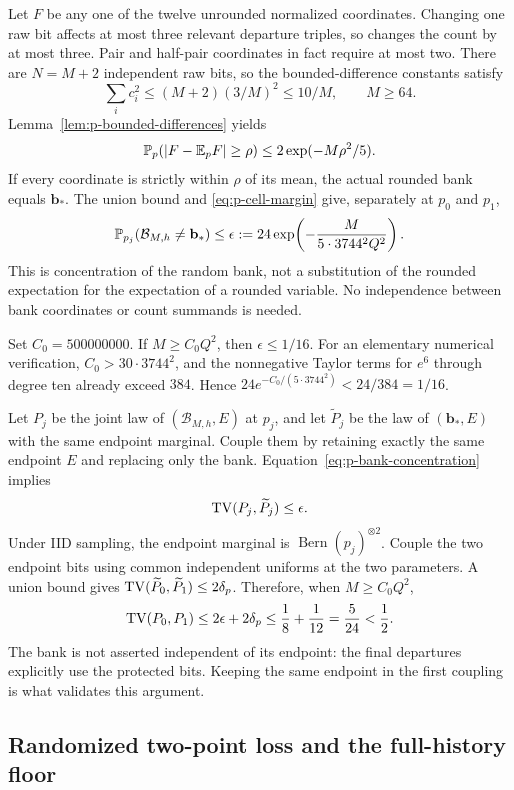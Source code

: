Let $F$ be any one of the twelve unrounded normalized coordinates.
Changing one raw bit affects at most three relevant departure triples,
so changes the count by at most three.  Pair and half-pair coordinates
in fact require at most two.  There are $N=M+2$ independent raw bits,
so the bounded-difference constants satisfy
\[
 \sum_i c_i^2\le(M+2)(3/M)^2\le10/M,\qquad M\ge64.
\]
Lemma~\ref{lem:p-bounded-differences} yields
\[
 \mathbb P_p(|F-\mathbb E_pF|\ge\rho)\le2\exp(-M\rho^2/5).
\]
If every coordinate is strictly within $\rho$ of its mean, the actual rounded
bank equals $\mathbf b_*$.  The union bound and
\eqref{eq:p-cell-margin} give, separately at $p_0$ and $p_1$,
\begin{equation}\label{eq:p-bank-concentration}
 \mathbb P_{p_j}(\mathcal B_{M,h}\ne\mathbf b_*)
 \le\epsilon:=24\exp\!\left(-\frac{M}{5\cdot3744^2Q^2}\right).
\end{equation}
This is concentration of the random bank, not a substitution of the
rounded expectation for the expectation of a rounded variable.
No independence between bank coordinates or count summands is needed.

Set $C_0=500000000$.  If $M\ge C_0Q^2$, then
$\epsilon\le1/16$.  For an elementary numerical verification,
$C_0>30\cdot3744^2$, and the nonnegative Taylor terms for $e^6$
through degree ten already exceed $384$.  Hence
$24e^{-C_0/(5\cdot3744^2)}<24/384=1/16$.

Let $P_j$ be the joint law of $(\mathcal B_{M,h},E)$ at $p_j$, and
let $\widetilde P_j$ be the law of $(\mathbf b_*,E)$ with the same
endpoint marginal.  Couple them by retaining exactly the same endpoint
$E$ and replacing only the bank.  Equation~\eqref{eq:p-bank-concentration}
implies
\[
 \operatorname{TV}(P_j,\widetilde P_j)\le\epsilon.
\]
Under IID sampling, the endpoint marginal is
$\operatorname{Bern}(p_j)^{\otimes2}$.  Couple the two endpoint bits
using common independent uniforms at the two parameters.  A union
bound gives $\operatorname{TV}(\widetilde P_0,\widetilde P_1)\le2\delta_p$.
Therefore, when $M\ge C_0Q^2$,
\begin{equation}\label{eq:p-bank-TV}
 \operatorname{TV}(P_0,P_1)\le2\epsilon+2\delta_p
 \le\frac18+\frac1{12}=\frac5{24}<\frac12.
\end{equation}
The bank is not asserted independent of its endpoint: the final
departures explicitly use the protected bits.  Keeping the same
endpoint in the first coupling is what validates this argument.

\subsection{Randomized two-point loss and the full-history floor}

